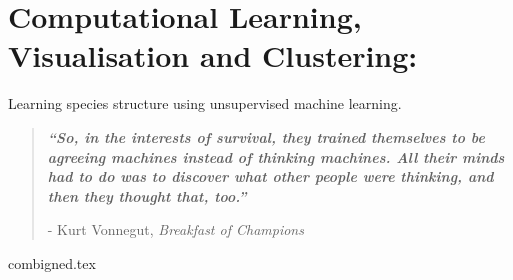 

\chapter{ Computational Learning, Visualisation and Clustering:}
\vspace{-1cm} {\Large Learning species structure using unsupervised machine learning. } 


\blankpage
\restoregeometry
\vspace*{0.15\paperheight}


\begin{center}
\begin{quotation}
  \large{\emph{\textbf{``So, in the interests of survival, they trained themselves to be agreeing machines instead of thinking machines. All their minds had to do was to discover what other people were thinking, and then they thought that, too.''} }  }  \\
  \begin{flushright}
  - Kurt Vonnegut, \textit{Breakfast of Champions} 
  \end{flushright}
 \end{quotation}
\end{center}
\doublespacing
\newpage

%

% 
% 



{combigned.tex} 

\chapterbib






